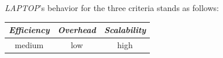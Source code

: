 %
%
%
%
\emph{LAPTOP}'s behavior for the three criteria stands as follows:
\begin{center}
{\footnotesize
\begin{tabular}{ccc}
\emph{Efficiency} & \emph{Overhead} & \emph{Scalability} \\
\hline
medium &
low &
high
\end{tabular}
}
\end{center}




